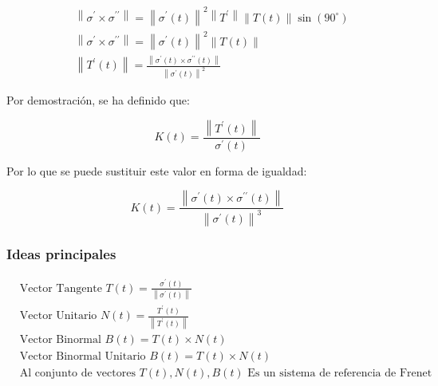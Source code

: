 \begin{align*}
	 & \left\lVert \sigma^{\prime}\times \sigma^{\prime\prime} \right\rVert=\left\lVert \sigma^{\prime}(t) \right\rVert^2\left\lVert T^{\prime} \right\rVert\left\lVert T(t) \right\rVert\sin{(90^{\circ})} \\
	 & \left\lVert \sigma^{\prime}\times \sigma^{\prime\prime} \right\rVert=\left\lVert \sigma^{\prime}(t) \right\rVert^2\left\lVert T(t) \right\rVert                                                      \\
	 & \left\lVert T^{\prime}(t) \right\rVert=\frac{\left\lVert \sigma^{\prime}(t)\times \sigma^{\prime\prime}(t) \right\rVert}{\left\lVert \sigma^{\prime}(t) \right\rVert^2}
\end{align*}

Por demostración, se ha definido que:

\begin{equation*}
	K(t)=\frac{\left\lVert T^{\prime}(t) \right\rVert}{\sigma^{\prime}(t)}
\end{equation*}

Por lo que se puede sustituir este valor en forma de igualdad:

\begin{equation}
	K(t)=\frac{\left\lVert \sigma^{\prime}(t)\times \sigma^{\prime\prime}(t) \right\rVert}{\left\lVert \sigma^{\prime}(t) \right\rVert^3}
\end{equation}

\subsubsection{Ideas principales}


\begin{align*}
	 & \text{Vector Tangente }T(t)=\frac{\sigma^{\prime}(t)}{\left\lVert \sigma^{\prime}(t)\right\rVert } \\
	 & \text{Vector Unitario }N(t)=\frac{T^{\prime}(t)}{\left\lVert T^{\prime}(t)\right\rVert }           \\
	 & \text{Vector Binormal }B(t)=T(t)\times N(t)                                                        \\
	 & \text{Vector Binormal Unitario }B(t)=T(t)\times N(t)                                               \\
	 & \text{Al conjunto de vectores }T(t),N(t),B(t)\text{ Es un sistema de referencia de Frenet}         \\
\end{align*}

